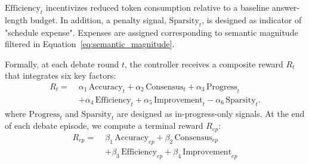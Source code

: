 $\mathrm{Efficiency}_t$ incentivizes reduced token consumption relative to a baseline answer-length budget. 
In addition, a penalty signal, $\mathrm{Sparsity}_t$, is designed as indicator of "schedule expense". Expenses are assigned corresponding to semantic magnitude filtered in Equation~\ref{eq:semantic_magnitude}.

Formally, at each debate round $t$, the controller receives a composite reward $R_t$ that integrates six key factors:
\begin{align}
R_t = \;& \alpha_1\,\mathrm{Accuracy}_t + \alpha_2\,\mathrm{Consensus}_t + \alpha_3\,\mathrm{Progress}_t \\
 &+ \alpha_4\,\mathrm{Efficiency}_t + \alpha_5\,\mathrm{Improvement}_t - \alpha_6\,\mathrm{Sparsity}_t. \nonumber
\end{align}
where $\mathrm{Progress}_t$ and $\mathrm{Sparsity}_t$ are designed as in-progress-only signals. At the end of each debate episode, we compute a terminal reward $R_{{ep}}$:
\begin{align}
R_{{ep}} =\; & \beta_1\,\mathrm{Accuracy}_{{ep}} + \beta_2\,\mathrm{Consensus}_{{ep}} \\
& + \beta_3\,\mathrm{Efficiency}_{{ep}}  + \beta_4\,\mathrm{Improvement}_{{ep}} \nonumber
\end{align}




